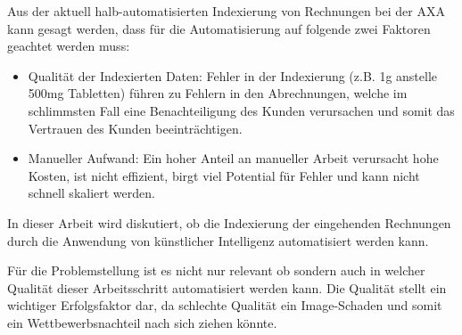


Aus der aktuell halb-automatisierten Indexierung von Rechnungen bei der AXA kann gesagt werden, dass für die Automatisierung auf folgende zwei Faktoren geachtet werden muss:

\begin{itemize}
    \item Qualität der Indexierten Daten: Fehler in der Indexierung (z.B. 1g anstelle 500mg Tabletten) führen zu Fehlern in den Abrechnungen, welche im schlimmsten Fall eine Benachteiligung des Kunden verursachen und somit das Vertrauen des Kunden beeinträchtigen.
    \item Manueller Aufwand: Ein hoher Anteil an manueller Arbeit verursacht hohe Kosten, ist nicht effizient, birgt viel Potential für Fehler und kann nicht schnell skaliert werden.
\end{itemize}


In dieser Arbeit wird diskutiert, ob die Indexierung der eingehenden Rechnungen durch die Anwendung von künstlicher Intelligenz automatisiert werden kann.

Für die Problemstellung ist es nicht nur relevant ob sondern auch in welcher Qualität dieser Arbeitsschritt automatisiert werden kann. Die Qualität stellt ein wichtiger Erfolgsfaktor dar, da schlechte Qualität ein Image-Schaden und somit ein Wettbewerbsnachteil nach sich ziehen könnte.

